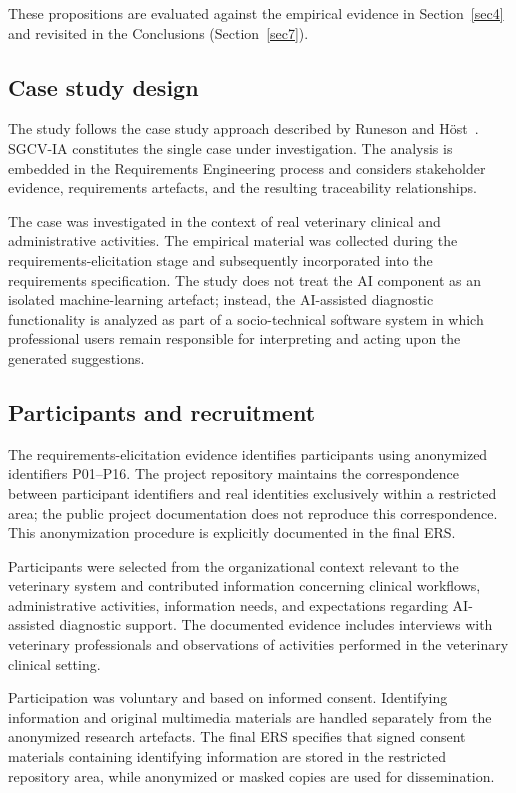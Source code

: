 \documentclass[pdflatex,sn-mathphys-num,Numbered]{sn-jnl}
\begin{document}
These propositions are evaluated against the empirical evidence in Section~\ref{sec4} and revisited in the Conclusions (Section~\ref{sec7}).

\subsection{Case study design}\label{subsec2}

The study follows the case study approach described by Runeson and H\"ost~\cite{runeson2009}. SGCV-IA constitutes the single case under investigation. The analysis is embedded in the Requirements Engineering process and considers stakeholder evidence, requirements artefacts, and the resulting traceability relationships.

The case was investigated in the context of real veterinary clinical and administrative activities. The empirical material was collected during the requirements-elicitation stage and subsequently incorporated into the requirements specification. The study does not treat the AI component as an isolated machine-learning artefact; instead, the AI-assisted diagnostic functionality is analyzed as part of a socio-technical software system in which professional users remain responsible for interpreting and acting upon the generated suggestions.

\subsection{Participants and recruitment}\label{subsec3}

The requirements-elicitation evidence identifies participants using anonymized identifiers P01--P16. The project repository maintains the correspondence between participant identifiers and real identities exclusively within a restricted area; the public project documentation does not reproduce this correspondence. This anonymization procedure is explicitly documented in the final ERS.

Participants were selected from the organizational context relevant to the veterinary system and contributed information concerning clinical workflows, administrative activities, information needs, and expectations regarding AI-assisted diagnostic support. The documented evidence includes interviews with veterinary professionals and observations of activities performed in the veterinary clinical setting.

Participation was voluntary and based on informed consent. Identifying information and original multimedia materials are handled separately from the anonymized research artefacts. The final ERS specifies that signed consent materials containing identifying information are stored in the restricted repository area, while anonymized or masked copies are used for dissemination.
\end{document}
